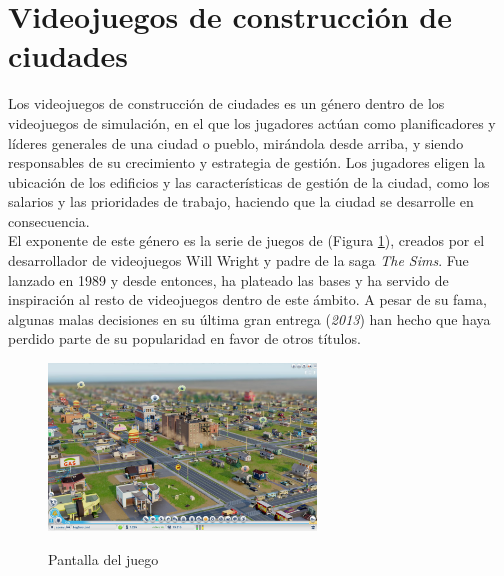 \section{Videojuegos de construcción de ciudades}

Los videojuegos de construcción de ciudades es un género dentro de los videojuegos de simulación, en el que los jugadores actúan como planificadores y líderes generales de una ciudad o pueblo, mirándola desde arriba, y siendo responsables de su crecimiento y estrategia de gestión. Los jugadores eligen la ubicación de los edificios y las características de gestión de la ciudad, como los salarios y las prioridades de trabajo, haciendo que la ciudad se desarrolle en consecuencia. \\

El exponente de este género es la serie de juegos de \simcityit (Figura \ref{fig:simcity}), creados por el desarrollador de videojuegos Will Wright y padre de la saga \textit{The Sims\texttrademark}. Fue lanzado en 1989 y desde entonces, ha plateado las bases y ha servido de inspiración al resto de videojuegos dentro de este ámbito. A pesar de su fama, algunas malas decisiones en su última gran entrega (\simcityit\textit{2013}) han hecho que haya perdido parte de su popularidad en favor de otros títulos. \\

\begin{figure}[h]
	\centering
	\includegraphics[height=12em]{images/SimCity}
	\label{fig:simcity}
	\caption{Pantalla del juego \simcityit}
\end{figure}

